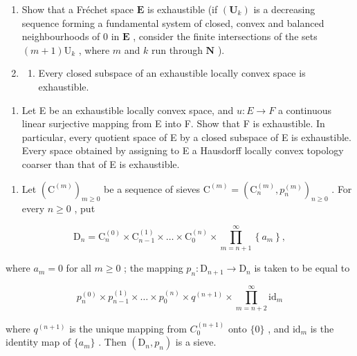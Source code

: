 \begin{enumerate}
\def\labelenumi{\arabic{enumi})}
\setcounter{enumi}{2}
\item
  Show that a Fréchet space \(\mathbf{E}\) is exhaustible (if \((\mathbf{U}_k)\) is a decreasing sequence forming a fundamental system of closed, convex and balanced neighbourhoods of 0 in \(\mathbf{E}\) , consider the finite intersections of the sets \((m + 1)\mathrm{U}_k\) , where \(m\) and \(k\) run through \(\mathbf{N}\) ).
\item
  \begin{enumerate}
  \def\labelenumii{\alph{enumii})}
  \tightlist
  \item
    Every closed subspace of an exhaustible locally convex space is exhaustible.
  \end{enumerate}
\end{enumerate}

\begin{enumerate}
\def\labelenumi{\alph{enumi})}
\setcounter{enumi}{1}
\tightlist
\item
  Let E be an exhaustible locally convex space, and \(u:E \rightarrow F\) a continuous linear surjective mapping from E into F. Show that F is exhaustible. In particular, every quotient space of E by a closed subspace of E is exhaustible. Every space obtained by assigning to E a Hausdorff locally convex topology coarser than that of E is exhaustible.
\end{enumerate}

\begin{enumerate}
\def\labelenumi{\arabic{enumi})}
\setcounter{enumi}{4}
\tightlist
\item
  Let \((\mathrm{C}^{(m)})_{m\geqslant 0}\) be a sequence of sieves \(\mathrm{C}^{(m)} = (\mathrm{C}_n^{(m)},p_n^{(m)})_{n\geqslant 0}\) . For every \(n\geqslant 0\) , put
\end{enumerate}

\[
\mathrm{D} _ {n} = \mathrm{C} _ {n} ^ {(0)} \times \mathrm{C} _ {n - 1} ^ {(1)} \times \dots \times \mathrm{C} _ {0} ^ {(n)} \times \prod_ {m = n + 1} ^ {\infty} \left\{a _ {m} \right\},
\]

where \(a_{m} = 0\) for all \(m\geqslant 0\) ; the mapping \(p_n:\mathrm{D}_{n + 1}\to \mathrm{D}_n\) is taken to be equal to

\[
p _ {n} ^ {(0)} \times p _ {n - 1} ^ {(1)} \times \dots \times p _ {0} ^ {(n)} \times q ^ {(n + 1)} \times \prod_ {m = n + 2} ^ {\infty} \mathrm{id} _ {m}
\]

where \(q^{(n + 1)}\) is the unique mapping from \(C_0^{(n + 1)}\) onto \(\{0\}\) , and \(\mathrm{id}_m\) is the identity map of \(\{a_m\}\) . Then \((\mathrm{D}_n, p_n)\) is a sieve.

